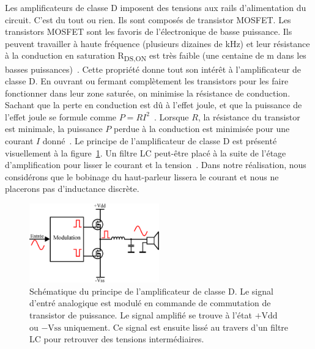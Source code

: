 \documentclass[10pt, oneside, a4paper]{article}
\begin{document}
Les amplificateurs de classe D imposent des tensions aux rails d'alimentation du circuit.
C'est du tout ou rien.
Ils sont composés de transistor MOSFET.
Les transistors MOSFET sont les favoris de l'électronique de basse puissance.
Ils peuvent travailler à haute fréquence (plusieurs dizaines de kHz) et leur résistance à la conduction en saturation \og{}R\textsubscript{DS,ON}\fg{} est très faible (une centaine de m\Omega{} dans les basses puissances)~\cite{irf2017mosfet}.
Cette propriété donne tout son intérêt à l'amplificateur de classe D.
En ouvrant ou fermant complètement les transistors pour les faire fonctionner dans leur zone saturée, on minimise la résistance de conduction.
Sachant que la perte en conduction est dû à l'effet joule, et que la puissance de l'effet joule se formule comme $P=RI^2$~\cite{griffiths1999introduction}.
Lorsque $R$, la résistance du transistor est minimale, la puissance $P$ perdue à la conduction est minimisée pour une courant $I$ donné~\cite{sente2017elec}.
Le principe de l'amplificateur de classe D est présenté visuellement à la figure~\ref{fig:classeD}.
Un filtre LC peut-être placé à la suite de l'étage d'amplification pour lisser le courant et la tension~\cite{wildi2005electrotech}.
Dans notre réalisation, nous considérons que le bobinage du haut-parleur lissera le courant et nous ne placerons pas d'inductance discrète.

\begin{figure}[htbp]
    \centering
    \includegraphics[width=0.5\textwidth]{eps/classe-d.eps}
    \caption{Schématique du principe de l'amplificateur de classe D.
             Le signal d'entré analogique est modulé en commande de commutation de
             transistor de puissance.
             Le signal amplifié se trouve à l'état $+\text{Vdd}$ ou $-\text{Vss}$
             uniquement.
             Ce signal est ensuite lissé au travers d'un filtre LC pour retrouver
             des tensions intermédiaires.}
    \label{fig:classeD}
\end{figure}


\end{document}
